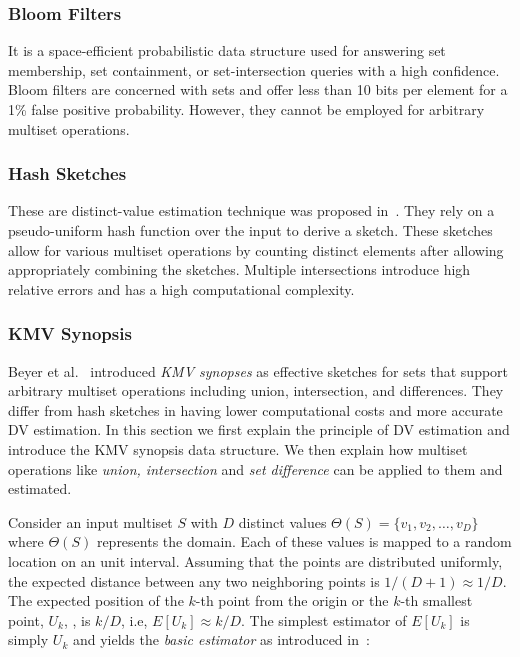 \subsubsection{Bloom Filters}
It is a space-efficient probabilistic data structure used for answering set membership, set containment, or set-intersection queries with a high confidence. Bloom filters are concerned with sets and offer less than 10 bits per element for a 1\% false positive probability. However, they cannot be employed for arbitrary multiset operations.

\subsubsection{Hash Sketches}

These are distinct-value estimation technique was proposed in~\cite{flajolet1985probabilistic}. They rely on a pseudo-uniform hash function over the input to derive a sketch. These sketches allow for various multiset operations by counting distinct elements after allowing appropriately combining the sketches. Multiple intersections introduce high relative errors and has a high computational complexity.


\subsubsection{KMV Synopsis} 
Beyer et al.~\cite{kmv:sigmod} introduced \textit{KMV synopses} 
as effective sketches for sets that support arbitrary multiset operations including union, intersection, and differences. They differ from hash sketches in having lower computational costs and more accurate DV estimation. In this section we first explain the principle of DV estimation and introduce the KMV synopsis data structure. We then explain how multiset operations like \emph{union, intersection} and \emph{set difference} can be applied to them and estimated.

Consider an input multiset $S$ with $D$ distinct values $\Theta(S) = \{v_1,v_2, \dots,v_D\}$ where $\Theta(S)$ represents the domain. Each of these values is mapped to a random location on an unit interval. Assuming that the points are distributed uniformly, the expected distance between any two neighboring points is $1/(D+1) \approx 1/D$. The expected position of the $k$-th point from the origin or the $k$-th smallest point, $U_{k}$, , is $k/D$, i.e, $E[U_{k}] \approx k/D$. The simplest estimator of $E[U_k]$ is simply $U_k$ and yields the \emph{basic estimator} as introduced in~\cite{bar2002counting}:

